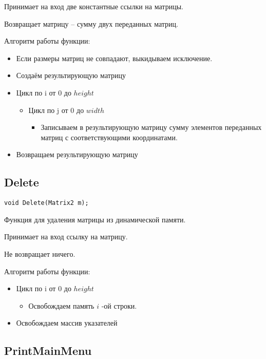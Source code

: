 Принимает на вход две константные ссылки на матрицы.

Возвращает матрицу -- сумму двух переданных матриц.

Алгоритм работы функции:

\begin{itemize}
	\item Если размеры матриц не совпадают, выкидываем исключение.
	\item Создаём результирующую матрицу
	\item Цикл по i от 0 до $ height $
	\begin{itemize}
		\item Цикл по j от 0 до $ width $
		\begin{itemize}
			\item Записываем в результирующую матрицу сумму
			элементов переданных матриц с соответствующими координатами.
		\end{itemize}
	\end{itemize}
	\item Возвращаем результирующую матрицу
\end{itemize}

\subsection*{Delete}

\begin{lstlisting}[label={lst:Delete}]
	void Delete(Matrix2 m);
\end{lstlisting}

Функция для удаления матрицы из динамической памяти.

Принимает на вход ссылку на матрицу.

Не возвращает ничего.

Алгоритм работы функции:

\begin{itemize}
	\item Цикл по i от 0 до $ height $
	\begin{itemize}
		\item Освобождаем память $ i $ -ой строки.
	\end{itemize}
	\item Освобождаем массив указателей
\end{itemize}

\subsection*{PrintMainMenu}

